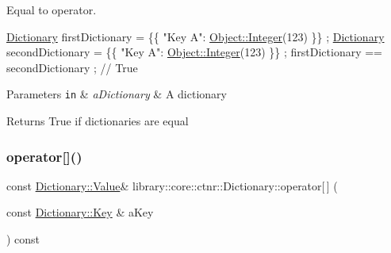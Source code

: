 Equal to operator. 


\begin{DoxyCode}
\hyperlink{classlibrary_1_1core_1_1ctnr_1_1Dictionary_a823a08112d9ee271f9fa5833f030ea1a}{Dictionary} firstDictionary = \{\{ \textcolor{stringliteral}{"Key A"}: \hyperlink{classlibrary_1_1core_1_1ctnr_1_1Object_a6746a69f0507b2c7ad8ebdf3d873b083}{Object::Integer}(123) \}\} ;
\hyperlink{classlibrary_1_1core_1_1ctnr_1_1Dictionary_a823a08112d9ee271f9fa5833f030ea1a}{Dictionary} secondDictionary = \{\{ \textcolor{stringliteral}{"Key A"}: \hyperlink{classlibrary_1_1core_1_1ctnr_1_1Object_a6746a69f0507b2c7ad8ebdf3d873b083}{Object::Integer}(123) \}\} ;
firstDictionary == secondDictionary ; \textcolor{comment}{// True}
\end{DoxyCode}



\begin{DoxyParams}[1]{Parameters}
\mbox{\tt in}  & {\em a\+Dictionary} & A dictionary \\
\hline
\end{DoxyParams}
\begin{DoxyReturn}{Returns}
True if dictionaries are equal 
\end{DoxyReturn}
\mbox{\label{classlibrary_1_1core_1_1ctnr_1_1Dictionary_ac5373f89362c83fee85e2d147d16eb40}} 
\subsubsection{\texorpdfstring{operator[]()}{operator[]()}\hspace{0.1cm}{\footnotesize\ttfamily [1/2]}}
{\footnotesize\ttfamily const \hyperlink{classlibrary_1_1core_1_1ctnr_1_1Dictionary_a3baf6692694e4fc27cb399ac083c88ea}{Dictionary\+::\+Value}\& library\+::core\+::ctnr\+::\+Dictionary\+::operator\mbox{[}$\,$\mbox{]} (\begin{DoxyParamCaption}\item[{const \hyperlink{classlibrary_1_1core_1_1ctnr_1_1Dictionary_a987cae687cce70d81a2a483c5e05e842}{Dictionary\+::\+Key} \&}]{a\+Key }\end{DoxyParamCaption}) const}



